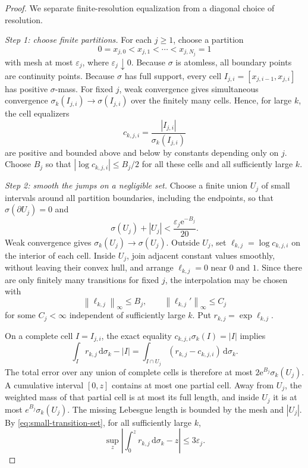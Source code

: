 \documentclass[11pt,oneside]{article}
\numberwithin{equation}{section}
\theoremstyle{definition}
\theoremstyle{remark}
\newcommand{\e}{\mathrm e}
\newcommand{\dd}{\,\mathrm d}
\newcommand{\norm}[1]{\left\lVert#1\right\rVert}
\begin{document}
\begin{proof}
We separate finite-resolution equalization from a diagonal choice of resolution.

\emph{Step 1: choose finite partitions.}
For each \(j\ge1\), choose a partition
\[
 0=x_{j,0}<x_{j,1}<\cdots<x_{j,N_j}=1
\]
with mesh at most \(\varepsilon_j\), where \(\varepsilon_j\downarrow0\).  Because \(\sigma\)
is atomless, all boundary points are continuity points.  Because \(\sigma\) has full
support, every cell \(I_{j,i}=[x_{j,i-1},x_{j,i}]\) has positive \(\sigma\)-mass.
For fixed \(j\), weak convergence gives simultaneous convergence
\(
 \sigma_k(I_{j,i})\to\sigma(I_{j,i})
\) over the finitely many cells.  Hence, for large \(k\), the cell equalizers
\begin{equation}
 c_{k,j,i}=\frac{|I_{j,i}|}{\sigma_k(I_{j,i})}
 \label{eq:cell-equalizer}
\end{equation}
are positive and bounded above and below by constants depending only on \(j\).  Choose
\(B_j\) so that \(|\log c_{k,j,i}|\le B_j/2\) for all these cells and all sufficiently
large \(k\).

\emph{Step 2: smooth the jumps on a negligible set.}
Choose a finite union \(U_j\) of small intervals around all partition boundaries, including
the endpoints, so that \(\sigma(\partial U_j)=0\) and
\begin{equation}
 \sigma(U_j)+|U_j|<\frac{\varepsilon_j\e^{-B_j}}{20}.
 \label{eq:small-transition-set}
\end{equation}
Weak convergence gives \(\sigma_k(U_j)\to\sigma(U_j)\).  Outside \(U_j\), set
\(\ell_{k,j}=\log c_{k,j,i}\) on the interior of each cell.  Inside \(U_j\), join adjacent
constant values smoothly, without leaving their convex hull, and arrange
\(\ell_{k,j}=0\) near \(0\) and \(1\).  Since there are only finitely many transitions for
fixed \(j\), the interpolation may be chosen with
\begin{equation}
 \norm{\ell_{k,j}}_\infty\le B_j,
 \qquad
 \norm{\ell_{k,j}'}_\infty\le C_j
 \label{eq:ell-bounds}
\end{equation}
for some \(C_j<\infty\) independent of sufficiently large \(k\).  Put
\(r_{k,j}=\exp\ell_{k,j}\).

On a complete cell \(I=I_{j,i}\), the exact equality
\(c_{k,j,i}\sigma_k(I)=|I|\) implies
\begin{equation}
 \int_Ir_{k,j}\dd\sigma_k-|I|
 =\int_{I\cap U_j}(r_{k,j}-c_{k,j,i})\dd\sigma_k.
 \label{eq:cell-error}
\end{equation}
The total error over any union of complete cells is therefore at most
\(2\e^{B_j}\sigma_k(U_j)\).  A cumulative interval \([0,z]\) contains at most one partial
cell.  Away from \(U_j\), the weighted mass of that partial cell is at most its full length,
and inside \(U_j\) it is at most \(e^{B_j}\sigma_k(U_j)\).  The missing Lebesgue length is
bounded by the mesh and \(|U_j|\).  By \eqref{eq:small-transition-set}, for all sufficiently
large \(k\),
\begin{equation}
 \sup_z\left|\int_0^zr_{k,j}\dd\sigma_k-z\right|\le3\varepsilon_j.
 \label{eq:finite-resolution-error}
\end{equation}


\end{proof}
\end{document}
